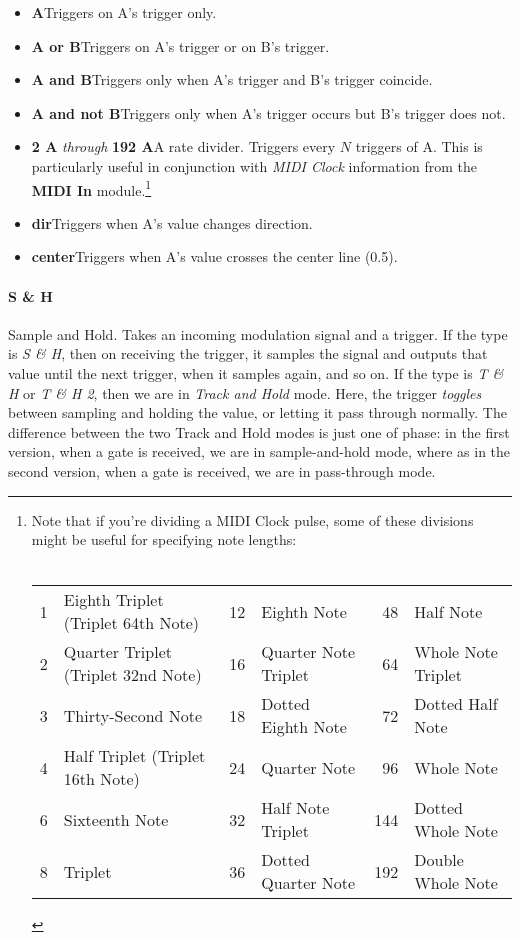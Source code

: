 \documentclass{article}
\begin{document}
\begin{itemize}
\item {\bf A}\quad Triggers on A's trigger only.
\item {\bf A or B}\quad Triggers on A's trigger or on B's trigger.
\item {\bf A and B}\quad Triggers only when A's trigger and B's trigger coincide.
\item {\bf A and not B}\quad Triggers only when A's trigger occurs but B's trigger does not.
\item {\bf 2 A} {\it through} {\bf 192 A}\quad A rate divider.  Triggers every \(N\) triggers of A.  This is particularly useful in conjunction with {\it MIDI Clock} information from the {\bf MIDI In} module.\footnote{Note that if you're dividing a MIDI Clock pulse, some of these divisions might be useful for specifying note lengths:\\
\\
\begin{tabular}{rlrlrl}
	1&	Eighth Triplet (Triplet 64th Note)	&12&	Eighth Note							&48&	Half Note		\\
	2&	Quarter Triplet (Triplet 32nd Note)	&16&	Quarter Note Triplet					&64&	Whole Note Triplet\\
	3&	Thirty-Second Note				&18&	Dotted Eighth Note				&72&	Dotted Half Note\\
	4&	Half Triplet (Triplet 16th Note)		&24&	Quarter Note				&96&	Whole Note\\
	6&	Sixteenth Note					&32&	Half Note Triplet				&144&	Dotted Whole Note\\
	8&	Triplet								&36&	Dotted Quarter Note									&192&	Double Whole Note\\
\end{tabular}\vspace{1em}
}
\item{\bf dir}\quad Triggers when A's value changes direction.
\item{\bf center}\quad Triggers when A's value crosses the center line (0.5).
\end{itemize}

\paragraph{S \& H}  Sample and Hold.  Takes an incoming modulation signal and a trigger.  If the type is {\it S \& H}, then on receiving the trigger, it samples the signal and outputs that value until the next trigger, when it samples again, and so on.  If the type is {\it T \& H} or {\it T \& H 2}, then we are in {\it Track and Hold} mode.  Here, the trigger {\it toggles} between sampling and holding the value, or letting it pass through normally.  The difference between the two Track and Hold modes is just one of phase: in the first version, when a gate is received, we are in sample-and-hold mode, where as in the second version, when a gate is received, we are in pass-through mode.
\end{document}
